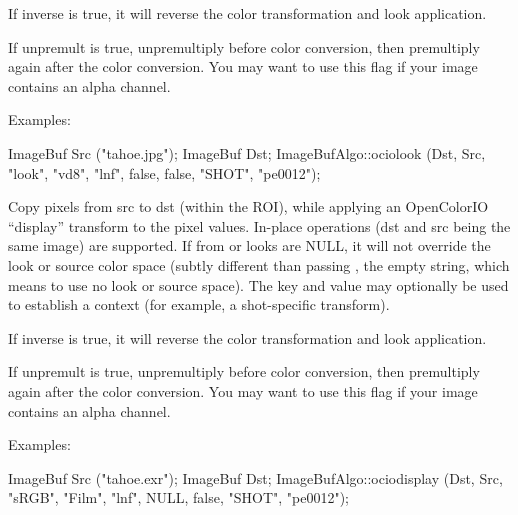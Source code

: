 If {\cf inverse} is {\cf true}, it will reverse the color transformation
and look application.

If {\cf unpremult} is {\cf true}, unpremultiply before color conversion,
then premultiply again after the color conversion.  You may want to use
this flag if your image contains an alpha channel.

\smallskip
\noindent Examples:
\begin{code}
    ImageBuf Src ("tahoe.jpg");
    ImageBuf Dst;
    ImageBufAlgo::ociolook (Dst, Src, "look", "vd8", "lnf", false, false,
                            "SHOT", "pe0012");
\end{code}
\apiend


 
Copy pixels from {\cf src} to {\cf dst} (within the ROI), while
applying an OpenColorIO ``display'' transform to the pixel values.
In-place operations ({\cf dst} and {\cf src} being the same image)
are supported.  If {\cf from} or {\cf looks} are {\cf NULL}, it will not
override the look or source color space (subtly different than
passing \qkw{}, the empty string, which means to use no look or source
space).  The {\cf key} and {\cf value} may optionally be used
to establish a context (for example, a shot-specific transform).

If {\cf inverse} is {\cf true}, it will reverse the color transformation
and look application.

If {\cf unpremult} is {\cf true}, unpremultiply before color conversion,
then premultiply again after the color conversion.  You may want to use
this flag if your image contains an alpha channel.

\smallskip
\noindent Examples:
\begin{code}
    ImageBuf Src ("tahoe.exr");
    ImageBuf Dst;
    ImageBufAlgo::ociodisplay (Dst, Src, "sRGB", "Film", "lnf", NULL,
                               false, "SHOT", "pe0012");
\end{code}
\apiend


